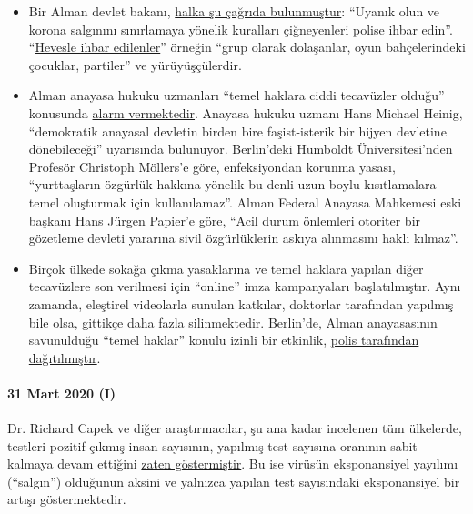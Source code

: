 \begin{itemize}
\tightlist
\item
  Bir Alman devlet bakanı,
  \href{https://de.nachrichten.yahoo.com/strobl-bürger-verstöße-gegen-corona-regeln-polizei-melden-095746341.html}{halka
  şu çağrıda bulunmuştur}: ``Uyanık olun ve korona salgınını sınırlamaya
  yönelik kuralları çiğneyenleri polise ihbar edin''.
  ``\href{https://www.br.de/nachrichten/bayern/buerger-melden-eifrig-verstoesse-gegen-corona-regeln,RuGXp1h}{Hevesle
  ihbar edilenler}'' örneğin ``grup olarak dolaşanlar, oyun
  bahçelerindeki çocuklar, partiler'' ve yürüyüşçülerdir. 
\item
  Alman anayasa hukuku uzmanları ``temel haklara ciddi tecavüzler
  olduğu'' konusunda
  \href{https://www.focus.de/politik/deutschland/corona-regelungen-der-regierung-medizin-darf-nicht-gefaehrlicher-sein-als-die-krankheit_id_11827625.html}{alarm
  vermektedir}. Anayasa hukuku uzmanı Hans Michael Heinig, ``demokratik
  anayasal devletin birden bire faşist-isterik bir hijyen devletine
  dönebileceği'' uyarısında bulunuyor. Berlin'deki Humboldt
  Üniversitesi'nden Profesör Christoph Möllers'e göre, enfeksiyondan
  korunma yasası, ``yurttaşların özgürlük hakkına yönelik bu denli uzun
  boylu kısıtlamalara temel oluşturmak için kullanılamaz''. Alman
  Federal Anayasa Mahkemesi eski başkanı Hans Jürgen Papier'e göre,
  ``Acil durum önlemleri otoriter bir gözetleme devleti yararına sivil
  özgürlüklerin askıya alınmasını haklı kılmaz''. 
\item
  Birçok ülkede sokağa çıkma yasaklarına ve temel haklara yapılan diğer
  tecavüzlere son verilmesi için ``online'' imza kampanyaları
  başlatılmıştır. Aynı zamanda, eleştirel videolarla sunulan katkılar,
  doktorlar tarafından yapılmış bile olsa, gittikçe daha fazla
  silinmektedir. Berlin'de, Alman anayasasının savunulduğu ``temel
  haklar'' konulu izinli bir etkinlik,
  \href{https://kenfm.de/berliner-corona-demo-strafbar-aufgeloest-aber-froehlich/}{polis
  tarafından dağıtılmıştır}.
\end{itemize}

\hypertarget{31-mart-2020-i}{%
\paragraph{31 Mart 2020 (I)}\label{31-mart-2020-i}}

Dr. Richard Capek ve diğer araştırmacılar, şu ana kadar incelenen tüm
ülkelerde, testleri pozitif çıkmış insan sayısının, yapılmış test
sayısına oranının sabit kalmaya devam ettiğini
\href{https://coronadaten.wordpress.com/}{zaten göstermiştir}. Bu ise
virüsün eksponansiyel yayılımı (``salgın'') olduğunun aksini ve yalnızca
yapılan test sayısındaki eksponansiyel bir artışı göstermektedir.

